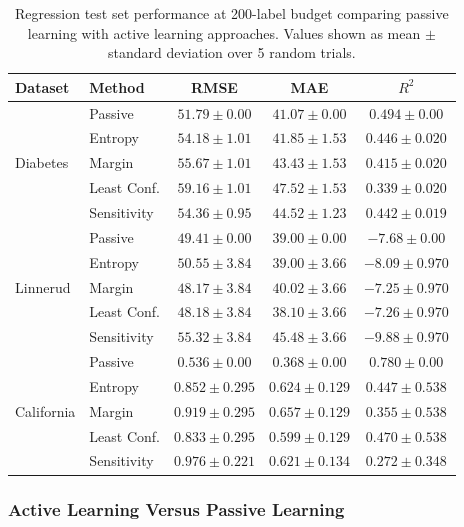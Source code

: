 \documentclass[conference]{IEEEtran}
\begin{document}
\begin{table}[t]
\centering
\caption{Regression test set performance at 200-label budget comparing passive learning with active learning approaches. Values shown as mean $\pm$ standard deviation over 5 random trials.}
\label{tab:reg-results}
\begin{tabular}{llccc}
\toprule
Dataset & Method & RMSE & MAE & $R^2$ \\
\midrule
\multirow{5}{*}{Diabetes} & Passive & $\mathbf{51.79 \pm 0.00}$ & $\mathbf{41.07 \pm 0.00}$ & $\mathbf{0.494 \pm 0.00}$ \\
 & Entropy & $54.18 \pm 1.01$ & $41.85 \pm 1.53$ & $0.446 \pm 0.020$ \\
 & Margin & $55.67 \pm 1.01$ & $43.43 \pm 1.53$ & $0.415 \pm 0.020$ \\
 & Least Conf. & $59.16 \pm 1.01$ & $47.52 \pm 1.53$ & $0.339 \pm 0.020$ \\
 & Sensitivity & $54.36 \pm 0.95$ & $44.52 \pm 1.23$ & $0.442 \pm 0.019$ \\
\midrule
\multirow{5}{*}{Linnerud} & Passive & $\mathbf{49.41 \pm 0.00}$ & $\mathbf{39.00 \pm 0.00}$ & $\mathbf{-7.68 \pm 0.00}$ \\
 & Entropy & $50.55 \pm 3.84$ & $39.00 \pm 3.66$ & $-8.09 \pm 0.970$ \\
 & Margin & $48.17 \pm 3.84$ & $40.02 \pm 3.66$ & $-7.25 \pm 0.970$ \\
 & Least Conf. & $48.18 \pm 3.84$ & $38.10 \pm 3.66$ & $-7.26 \pm 0.970$ \\
 & Sensitivity & $55.32 \pm 3.84$ & $45.48 \pm 3.66$ & $-9.88 \pm 0.970$ \\
\midrule
\multirow{5}{*}{California} & Passive & $\mathbf{0.536 \pm 0.00}$ & $\mathbf{0.368 \pm 0.00}$ & $\mathbf{0.780 \pm 0.00}$ \\
 & Entropy & $0.852 \pm 0.295$ & $0.624 \pm 0.129$ & $0.447 \pm 0.538$ \\
 & Margin & $0.919 \pm 0.295$ & $0.657 \pm 0.129$ & $0.355 \pm 0.538$ \\
 & Least Conf. & $0.833 \pm 0.295$ & $0.599 \pm 0.129$ & $0.470 \pm 0.538$ \\
 & Sensitivity & $0.976 \pm 0.221$ & $0.621 \pm 0.134$ & $0.272 \pm 0.348$ \\
\bottomrule
\end{tabular}
\end{table}

\subsubsection{Active Learning Versus Passive Learning}
\end{document}
